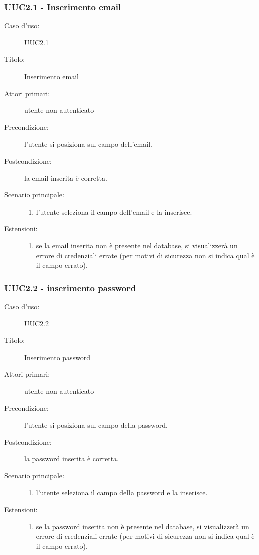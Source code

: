 \documentclass[casi-duso]{subfiles}
\begin{document}
\subsubsection{UUC2.1 - Inserimento email}%
\label{subsub:UUC2.1utente}
\begin{description}
  \item[Caso d’uso:] UUC2.1
  \item[Titolo:] Inserimento email
  \item[Attori primari:] utente non autenticato
  \item[Precondizione:] l'utente si posiziona sul campo dell'email.
  \item[Postcondizione:] la email inserita è corretta.
  \item[Scenario principale:]
        \begin{enumerate}
          \item l'utente seleziona il campo dell'email e la inserisce.
        \end{enumerate}
  \item[Estensioni:]
        \begin{enumerate}
          \item se la email inserita non è presente nel database, si visualizzerà un errore di credenziali errate (per motivi di sicurezza
                non si indica qual è il campo errato).
        \end{enumerate}
\end{description}

\subsubsection{UUC2.2 - inserimento password}%
\label{subsub:UUC2.2utente}
\begin{description}
  \item[Caso d’uso:] UUC2.2
  \item[Titolo:] Inserimento password
  \item[Attori primari:] utente non autenticato
  \item[Precondizione:] l'utente si posiziona sul campo della password.
  \item[Postcondizione:] la password inserita è corretta.
  \item[Scenario principale:]
        \begin{enumerate}
          \item l'utente seleziona il campo della password e la inserisce.
        \end{enumerate}
  \item[Estensioni:]
        \begin{enumerate}
          \item se la password inserita non è presente nel database, si visualizzerà un errore di credenziali errate (per motivi di sicurezza
                non si indica qual è il campo errato).
        \end{enumerate}
\end{description}
\end{document}
